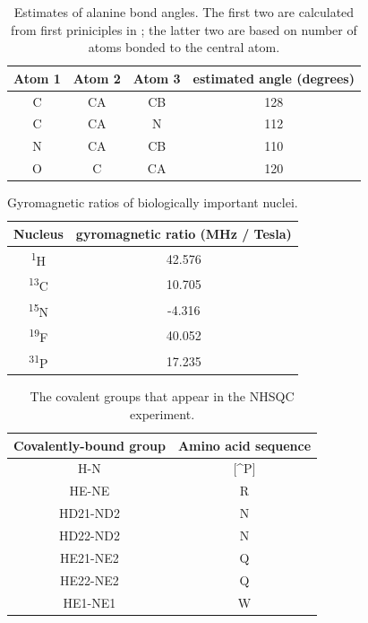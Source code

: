 \begin{table}
  \begin{tabular}{ | c | c | c | c | }
    \hline
    Atom 1  &   Atom 2  &  Atom 3  &  estimated angle (degrees)   \\  \hline
    C   &   CA  &   CB  &   128  \\  \hline
    C   &   CA  &   N   &   112  \\  \hline
    N   &   CA  &   CB  &   110  \\  \hline
    O   &   C   &   CA  &   120  \\  \hline
  \end{tabular}
  \caption[Estimates of alanine bond angles.]
          {Estimates of alanine bond angles.  The first two are
           calculated from first priniciples in \cite{alanine_sreepad};
           the latter two are based on number of atoms bonded
           to the central atom.}
  \label{alanine_bond_angles}
\end{table}

\begin{table}
  \begin{tabular}{ | c | c | }
    \hline
    Nucleus &   gyromagnetic ratio (MHz / Tesla)  \\  \hline
    \textsuperscript{1}H    &   42.576  \\  \hline
    \textsuperscript{13}C   &   10.705  \\  \hline
    \textsuperscript{15}N   &   -4.316  \\  \hline
    \textsuperscript{19}F   &   40.052  \\  \hline
    \textsuperscript{31}P   &   17.235  \\  \hline
  \end{tabular}
  \caption{Gyromagnetic ratios of biologically important nuclei.}
  \label{gyromagnetic_ratios}
\end{table}

\begin{table}
  \begin{tabular}{ | c | c | }
    \hline
    Covalently-bound group       &  Amino acid sequence  \\  \hline
    H-N                          &  [\^{}P]              \\  \hline
    HE-NE                        &  R                    \\  \hline
    HD21-ND2                     &  N                    \\  \hline
    HD22-ND2                     &  N                    \\  \hline
    HE21-NE2                     &  Q                    \\  \hline
    HE22-NE2                     &  Q                    \\  \hline
    HE1-NE1                      &  W                    \\  \hline
  \end{tabular}
  \caption{The covalent groups that appear in the NHSQC experiment.}
  \label{nhsqc_peaktypes}
\end{table}

